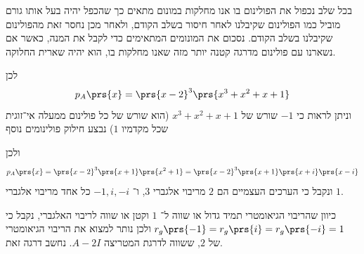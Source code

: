 \documentclass[a4paper,10pt,twoside,openany]{book}
\begin{document}
\begin{solution}
בכל שלב נכפול את הפולינום בו אנו מחלקות במונום מתאים כך שהכפל יהיה בעל אותו גורם מוביל כמו הפולינום שקיבלנו לאחר חיסור בשלב הקודם, ולאחר מכן נחסר זאת מהפולינום שקיבלנו בשלב הקודם. נסכום את המונומים המתאימים כדי לקבל את המנה, כאשר אם נשארנו עם פולינום מדרגה קטנה יותר מזה שאנו מחלקות בו, הוא יהיה שארית החלוקה.

\begin{center}
\end{center}

לכן
\[p_A\prs{x} = \prs{x-2}^3 \prs{x^3 + x^2 + x + 1}\]
וניתן לראות כי
$-1$
שורש של
$x^3 + x^2 + x + 1$
(הוא שורש של כל פולינום ממעלה אי־זוגית שכל מקדמיו
$1$)
נבצע חילוק פולינומים נוסף

\begin{center}
\end{center}

ולכן
\[p_A\prs{x} = \prs{x-2}^3 \prs{x+1} \prs{x^2 + 1} = \prs{x-2}^3 \prs{x+1} \prs{x + i} \prs{x - i}\]
ונקבל כי הערכים העצמיים הם
$2$
מריבוי אלגברי
$3$,
ו־%
$-1, i, -i$
כל אחד מריבוי אלגברי
$1$.

כיוון שהריבוי הגיאומטרי תמיד גדול או שווה ל־%
$1$
וקטן או שווה לריבוי האלגברי, נקבל כי
$r_g\prs{-1} = r_g\prs{i} = r_g\prs{-i} = 1$
ולכן נותר למצוא את הריבוי הגיאומטרי של
$2$,
ששווה לדרגת המטריצה
$A - 2I$.
נחשב דרגה זאת.


\end{solution}
\end{document}
